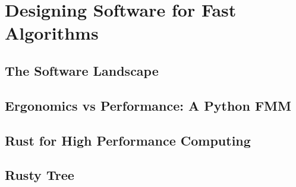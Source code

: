 \chapter{Designing Software for Fast Algorithms}\label{chpt:2}


\section{The Software Landscape}\label{sec:2_1}


\section{Ergonomics vs Performance: A Python FMM}\label{sec:2_2}


\section{Rust for High Performance Computing}\label{sec:2_3}


\section{Rusty Tree}\label{sec:2_4}


